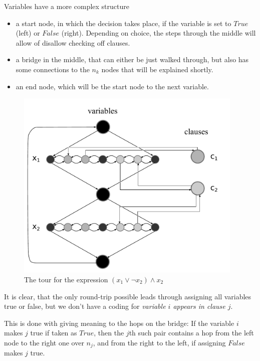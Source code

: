 Variables have a more complex structure

\begin{itemize}
	\item a start node, in which the decision takes place, if the variable is 
		set to $True$ (left) or $False$ (right). Depending on choice, the steps 
		through the middle will allow of disallow checking off clauses.
	\item a bridge in the middle, that can either be just walked through, but 
		also has some connections to the $n_k$ nodes that will be explained shortly.
	\item an end node, which will be the start node to the next variable.
\end{itemize}

\begin{figure}[htb]
	\includegraphics[width=0.97\textwidth]{complexity/langcomplexity/pictures/satastsp}
	\caption{The tour for the expression $(x_1\vee\lnot x_2)\wedge x_2$}
	
\end{figure}

It is clear, that the only 
round-trip possible leads through assigning all variables true or false, but 
we don't have a coding for \emph{variable $i$ appears in clause $j$}. 

This is done with giving meaning to the hops on the bridge: If the variable 
$i$ makes $j$ true if taken as $True$, then the $j$th such pair contains 
a hop from the left node to the right one over $n_j$, and from the right to 
the left, if assigning $False$ makes $j$ true.

